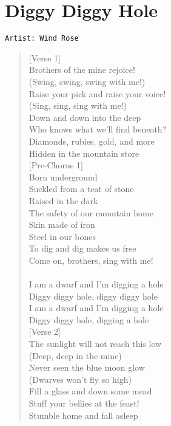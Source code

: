 \documentclass[11pt]{article}
\begin{document}
\section{Diggy Diggy Hole}
\label{sec:orga6e115c}
\begin{verbatim}
Artist: Wind Rose
\end{verbatim}
\begin{verse}
[Verse 1]\\
Brothers of the mine rejoice!\\
(Swing, swing, swing with me!)\\
Raise your pick and raise your voice!\\
(Sing, sing, sing with me!)\\
Down and down into the deep\\
Who knows what we'll find beneath?\\
Diamonds, rubies, gold, and more\\
Hidden in the mountain store\\
\vspace*{1em}
[Pre-Chorus 1]\\
Born underground\\
Suckled from a teat of stone\\
Raised in the dark\\
The safety of our mountain home\\
Skin made of iron\\
Steel in our bones\\
To dig and dig makes us free\\
Come on, brothers, sing with me!\\
[Chorus]\\
I am a dwarf and I'm digging a hole\\
Diggy diggy hole, diggy diggy hole\\
I am a dwarf and I'm digging a hole\\
Diggy diggy hole, digging a hole\\
\vspace*{1em}
[Verse 2]\\
The sunlight will not reach this low\\
(Deep, deep in the mine)\\
Never seen the blue moon glow\\
(Dwarves won't fly so high)\\
Fill a glass and down some mead\\
Stuff your bellies at the feast!\\
Stumble home and fall asleep\\

\end{verse}
\end{document}
